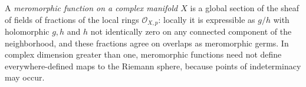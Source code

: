 
A \emph{meromorphic function on a complex manifold $X$} is a global section of the sheaf of fields of fractions of the local rings $\mathcal O_{X,p}$: locally it is expressible as $g/h$ with holomorphic $g,h$ and $h$ not identically zero on any connected component of the neighborhood, and these fractions agree on overlaps as meromorphic germs. In complex dimension greater than one, meromorphic functions need not define everywhere-defined maps to the Riemann sphere, because points of indeterminacy may occur.
